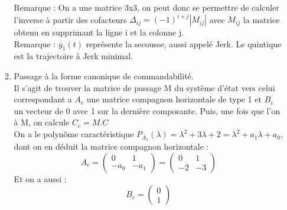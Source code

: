 \documentclass[../main.tex]{subfiles}
\begin{document}
\begin{enumerate}
\begin{enumerate}
Remarque : On a une matrice 3x3, on peut donc se permettre de calculer l'inverse à partir des cofacteurs $\Delta_{ij} = (-1)^{i+j}|M_{ij}|$ avec $M_{ij}$ la matrice obtenu en supprimant la ligne i et la colonne j.\\

Remarque : $\ddot{y_1}(t)$ représente la secousse, aussi appelé Jerk.
Le quintique est la trajectoire à Jerk minimal.
\bigbreak
\bigbreak
\item Passage à la forme canonique de commandabilité.\\
Il s'agit de trouver la matrice de passage M du système d'état vers celui correspondant a $A_c$ une matrice compagnon horizontale de type 1 et $B_c$ un vecteur de 0 avec 1 sur la dernière composante. Puis, une fois que l'on à M, on calcule $C_c = M.C$\\

On a le polynôme caractéristique $P_{A_1}(\lambda) = \lambda^2 + 3\lambda + 2 = \lambda^2 + a_1\lambda + a_0$, dont on en déduit la matrice compagnon horizontale :
\[ A_c = \begin{pmatrix}
0&1\\-a_0&-a_1
\end{pmatrix} = \begin{pmatrix}
0&1\\-2&-3
\end{pmatrix}\]
Et on a aussi :
\[B_c = \begin{pmatrix}
0\\1\end{pmatrix}\]


\end{enumerate}
\end{enumerate}
\end{document}
